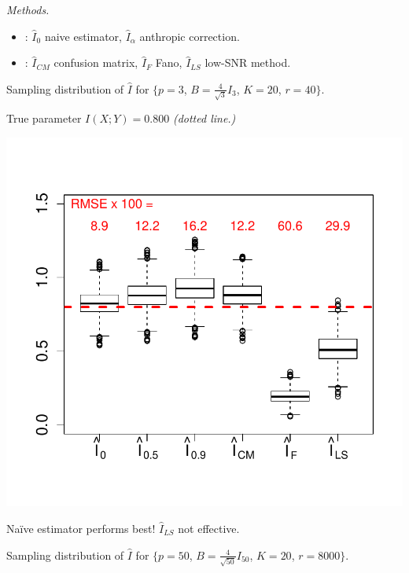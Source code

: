 \documentclass[12pt]{article}
\begin{document}
\emph{Methods.}
\begin{itemize}
\item {}: $\hat{I}_0$ naive estimator, $\hat{I}_\alpha$ anthropic correction.
\item {}: $\hat{I}_{CM}$ confusion matrix, $\hat{I}_F$ Fano, $\hat{I}_{LS}$ low-SNR method.
\end{itemize}

Sampling distribution of $\hat{I}$ for \small{$\{p = 3$, $B = \frac{4}{\sqrt{3}} I_3$, $K = 20$, $r = 40\}$.}

True parameter $I(X; Y) = 0.800$ \emph{(dotted line.)}
\begin{center}
\includegraphics[scale = 0.5, clip = true, trim = 0 0.5in 0 0.5in]{../info_theory_sims/fig1.pdf}
\end{center}
Na\"{i}ve estimator performs best!  $\hat{I}_{LS}$ not effective.

Sampling distribution of $\hat{I}$ for \small{$\{p = 50$, $B = \frac{4}{\sqrt{50}} I_{50}$, $K = 20$, $r = 8000\}$.}
\end{document}
